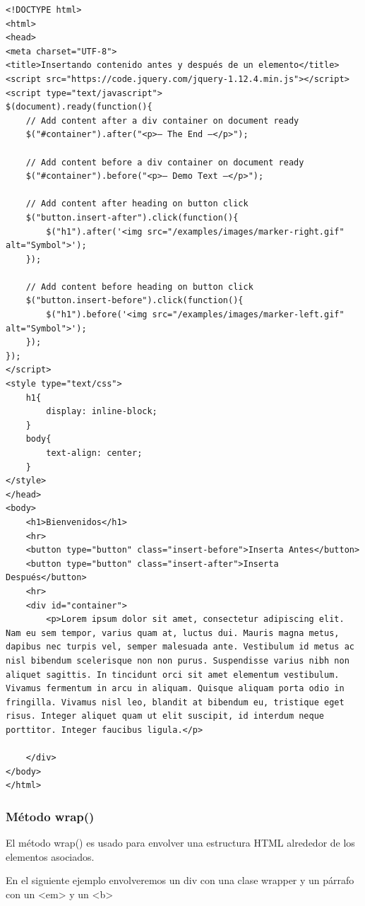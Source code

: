 \documentclass[11pt]{article}
\begin{document}
\begin{verbatim}
<!DOCTYPE html>
<html>
<head>
<meta charset="UTF-8">
<title>Insertando contenido antes y después de un elemento</title>
<script src="https://code.jquery.com/jquery-1.12.4.min.js"></script>
<script type="text/javascript">
$(document).ready(function(){
    // Add content after a div container on document ready
    $("#container").after("<p>— The End —</p>");

    // Add content before a div container on document ready
    $("#container").before("<p>— Demo Text —</p>");

    // Add content after heading on button click
    $("button.insert-after").click(function(){
        $("h1").after('<img src="/examples/images/marker-right.gif" alt="Symbol">');
    });

    // Add content before heading on button click
    $("button.insert-before").click(function(){
        $("h1").before('<img src="/examples/images/marker-left.gif" alt="Symbol">');
    });
});
</script>
<style type="text/css">
    h1{
        display: inline-block; 
    }
    body{
        text-align: center;
    }
</style>
</head>
<body>
    <h1>Bienvenidos</h1>
    <hr>
    <button type="button" class="insert-before">Inserta Antes</button>
    <button type="button" class="insert-after">Inserta Después</button>
    <hr>
    <div id="container">
        <p>Lorem ipsum dolor sit amet, consectetur adipiscing elit. Nam eu sem tempor, varius quam at, luctus dui. Mauris magna metus, dapibus nec turpis vel, semper malesuada ante. Vestibulum id metus ac nisl bibendum scelerisque non non purus. Suspendisse varius nibh non aliquet sagittis. In tincidunt orci sit amet elementum vestibulum. Vivamus fermentum in arcu in aliquam. Quisque aliquam porta odio in fringilla. Vivamus nisl leo, blandit at bibendum eu, tristique eget risus. Integer aliquet quam ut elit suscipit, id interdum neque porttitor. Integer faucibus ligula.</p>

    </div>
</body>
</html>   
\end{verbatim}

\subsubsection*{Método wrap()}
\label{sec:org70a2aa6}

El método wrap() es usado para envolver una estructura HTML alrededor de los elementos asociados. 

En el siguiente ejemplo envolveremos un div con una clase wrapper y un párrafo con un <em> y un <b>
\end{document}
